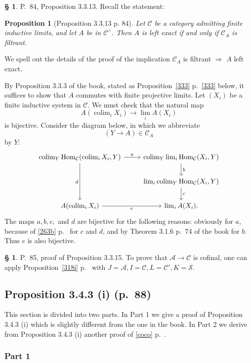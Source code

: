 \documentclass[12pt]{article}
\newtheorem{prop}[thm]{Proposition}
\theoremstyle{remark}
\theoremstyle{definition}
\newtheorem{s}[thm]{\S}
\newcommand{\cc}{\mathcal}
\newcommand{\A}{\mathcal A}
\newcommand{\C}{\mathcal C}
\newcommand{\then}{\Rightarrow}
\DeclareMathOperator*{\colim}{colim}
\DeclareMathOperator{\Hom}{Hom}
\begin{document}
\begin{s}
P.~84, Proposition 3.3.13. Recall the statement:

\begin{prop}[Proposition 3.3.13 p. 84]
Let $\C$ be a category admitting finite inductive limits, and let $A$ be in $\C^\wedge$. Then $A$ is left exact if and only if $\C_A$ is filtrant.
\end{prop}

We spell out the details of the proof of the implication $\C_A$ is filtrant $\then$ $A$ left exact.

By Proposition 3.3.3 of the book, stated as Proposition~\ref{333} p.~\ref{333} below, it suffices to show that $A$ commutes with finite projective limits. Let $(X_i)$ be a finite inductive system in $\C$. We must check that the natural map 
$$
A(\colim_i X_i)\to\lim_iA(X_i)
$$ 
is bijective. Consider the diagram below, in which we abbreviate 
$$
(Y\to A)\in\C_A
$$ 
by $Y$: 
$$
\begin{tikzcd}
\colim_Y\Hom_\C(\colim_iX_i,Y)\ar{r}{a}\ar{dd}[swap]{d}&\colim_Y\lim_i\Hom_\C(X_i,Y)\ar{d}{b}\\ 
{}&\lim_i\colim_Y\Hom_\C(X_i,Y)\ar{d}{c}\\ 
A(\colim_iX_i)\ar{r}[swap]{e}&\lim_iA(X_i).
\end{tikzcd}
$$ 
The maps $a,b,c,$ and $d$ are bijective for the following reasons: obviously for $a$, because of \eqref{263b} p.~\pageref{263b} for $c$ and $d$, and by Theorem 3.1.6 p.~74 of the book for $b$. Thus $e$ is also bijective.
\end{s}

%

\begin{s}\label{3315}
P.~85, proof of Proposition 3.3.15. To prove that $\A\to\C$ is cofinal, one can apply Proposition~\ref{318i} p.~\pageref{318i} with $J=\A,I=\C,L=\C',K=\cc S$. 
\end{s}


\subsection{Proposition 3.4.3 (i) (p.~88)}

This section is divided into two parts. In Part 1 we give a proof of Proposition 3.4.3 (i) which is slightly different from the one in the book. In Part 2 we derive from Proposition 3.4.3 (i) another proof of \eqref{coco} p.~\pageref{coco}. 

\subsubsection{Part 1} 
\end{document}
